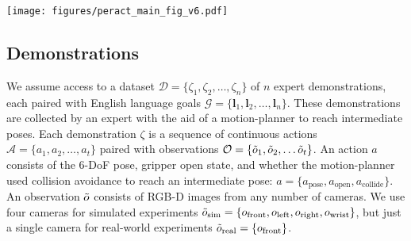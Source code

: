 \documentclass{article}
\newcommand{\appfigref}[1]{Appendix Figure~\ref{#1}}
\newcommand{\model}{\textsc{PerAct}}
\begin{document}
\newpage
\begin{figure*}[!t]
    \centering
    \hspace*{-2.2cm}
    \texttt{[image: figures/peract\_main\_fig\_v6.pdf]}
    \vspace{-0.4cm}
    \caption{\textbf{\model~Overview.} \model~is a language-conditioned behavior-cloning agent  trained with supervised learning to \textit{detect actions}. \model~takes as input a language goal and a voxel grid reconstructed from RGB-D sensors. The voxels are split into 3D patches, and the language goal is encoded with a pre-trained language model. These language and voxel features are appended together as a sequence and encoded with a Perceiver transformer~\citep{jaegle2021perceiver}. 
    Despite the extremely long input sequence, Perceiver uses a small set of latent vectors to encode the input (see \appfigref{fig:perceiver_arch} for an illustration). 
    These encodings are upsampled back to the original voxel dimensions with a decoder and reshaped with linear layers to predict a discretized translation, rotation, gripper open, and collision avoidance action. This action is executed with a motion-planner after which the new observation is used to predict the next discrete action in an observe-act loop until termination. 
    }
    \label{fig:peract}
    \vspace{-1.5em}
\end{figure*}
 
\vspace{-0.3cm} 
\subsection{Demonstrations} \label{sec:demos}
\vspace{-0.2cm}
We assume access to a dataset  $\mathcal{D} = \{\zeta_1, \zeta_2, \ldots, \zeta_n\}$ of $n$ expert demonstrations, each paired with English language goals $\mathcal{G} = \{\mathbf{l}_{1}, \mathbf{l}_{2}, \ldots, \mathbf{l}_{n}\}$. 
These demonstrations are collected by an expert with the aid of a motion-planner to reach intermediate poses. Each demonstration $\zeta$ is a sequence of continuous actions $\mathcal{A} = \{a_{1}, a_{2}, \ldots, a_{t}\}$ paired with observations $\mathcal{O} = \{\Tilde{o}_{1}, \Tilde{o}_{2}, \ldots \Tilde{o}_{t}\}$. An action $a$ consists of the 6-DoF pose, gripper open state, and whether the motion-planner used collision avoidance to reach an intermediate pose: $a = \{a_{\textrm{pose}}, a_{\textrm{open}}, a_{\textrm{collide}}\}$. 
An observation $\Tilde{o}$ consists of RGB-D images from any number of cameras. We use four cameras for simulated experiments $\Tilde{o}_{\textrm{sim}} = \{o_{\textrm{front}}, o_{\textrm{left}}, o_{\textrm{right}}, o_{\textrm{wrist}} \}$, but just a single camera  for real-world experiments $\Tilde{o}_{\textrm{real}} = \{o_{\textrm{front}} \}$.  
\vspace{-0.2cm}
\end{document}
